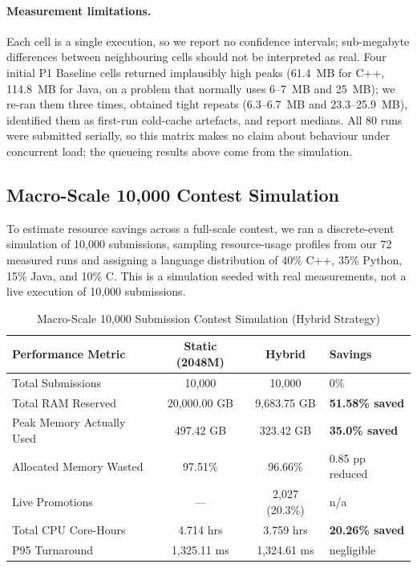 \documentclass[conference]{IEEEtran}
\begin{document}
\paragraph{Measurement limitations.} Each cell is a single execution, so we report no confidence intervals; sub-megabyte differences between neighbouring cells should not be interpreted as real. Four initial P1 Baseline cells returned implausibly high peaks (61.4~MB for C++, 114.8~MB for Java, on a problem that normally uses 6--7~MB and 25~MB); we re-ran them three times, obtained tight repeats (6.3--6.7~MB and 23.3--25.9~MB), identified them as first-run cold-cache artefacts, and report medians. All 80 runs were submitted serially, so this matrix makes no claim about behaviour under concurrent load; the queueing results above come from the simulation.


\subsection{Macro-Scale 10,000 Contest Simulation}
To estimate resource savings across a full-scale contest, we ran a discrete-event simulation of 10,000 submissions, sampling resource-usage profiles from our 72 measured runs and assigning a language distribution of 40\% C++, 35\% Python, 15\% Java, and 10\% C. This is a simulation seeded with real measurements, not a live execution of 10,000 submissions.

\begin{table}[!t]
\caption{Macro-Scale 10,000 Submission Contest Simulation (Hybrid Strategy)}
\label{tab:macro_sim}
\centering
\small
\begin{tabular}{|P{2.4cm}|c|c|P{1.6cm}|}
\hline
\textbf{Performance Metric} & \textbf{Static (2048M)} & \textbf{Hybrid} & \textbf{Savings} \\
\hline
Total Submissions & 10,000 & 10,000 & 0\% \\
\hline
Total RAM Reserved & 20,000.00 GB & 9,683.75 GB & \textbf{51.58\% saved} \\
\hline
Peak Memory Actually Used & 497.42 GB & 323.42 GB & \textbf{35.0\% saved} \\
\hline
Allocated Memory Wasted & 97.51\% & 96.66\% & 0.85 pp reduced \\
\hline
Live Promotions & --- & 2,027 (20.3\%) & n/a \\
\hline
Total CPU Core-Hours & 4.714 hrs & 3.759 hrs & \textbf{20.26\% saved} \\
\hline
P95 Turnaround & 1,325.11 ms & 1,324.61 ms & negligible \\
\hline
\end{tabular}
\end{table}
\end{document}

